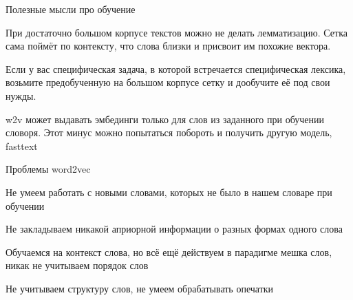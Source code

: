 \documentclass[notes,12pt, aspectratio=169]{beamer}
\newenvironment{wideitemize}{\itemize\addtolength{\itemsep}{10pt}}{\enditemize}
\begin{document}
\begin{frame}{Полезные мысли про обучение}
\begin{wideitemize} 
\item  При достаточно большом корпусе текстов можно не делать лемматизацию. Сетка сама поймёт по контексту, что слова близки и присвоит им похожие вектора.

\item Если у вас специфическая задача, в которой встречается специфическая лексика, возьмите предобученную на большом корпусе сетку и дообучите её под свои нужды.

\item \alert{w2v может выдавать эмбединги только для слов из заданного при обучении словоря.} Этот минус можно попытаться побороть и получить другую модель, fasttext
\end{wideitemize} 
\end{frame} 


\begin{frame}{Проблемы word2vec}
\begin{wideitemize} 
	\item Не умеем работать с новыми словами, которых не было в нашем словаре при обучении
	
	\item  Не закладываем никакой априорной информации о разных
	формах одного слова
	
	\item  Обучаемся на контекст слова, но всё ещё действуем в парадигме мешка слов, никак не учитываем порядок слов
	
	\item Не учитываем структуру слов, не умеем обрабатывать опечатки	
\end{wideitemize} 
\end{frame} 
\end{document}
